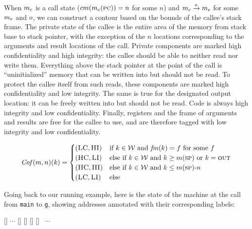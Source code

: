 \documentclass[acmsmall,review,anonymous]{acmart}\settopmatter{printfolios=true,printccs=false,printacmref=false}
\begin{document}
{When \(m_c\) is a call state (\(cm(m_c(\textsc{pc})) = n\) for some $n$) and
\(m_c \xrightarrow{o} m_e\) for some
$m_e$ and $o$, we can construct a contour based on the bounds of the
callee's stack frame.
%
The private state of the callee is the entire area of the memory from
stack base to stack pointer, with the exception of the $n$ locations
corresponding to the arguments and result locations of the
call. Private components are marked high confidentiality and high
integrity: the callee should be able to neither read nor write them.
%
Everything above the stack pointer at the point of the call is
``uninitialized'' memory that can be written into but should not be
read. To protect the callee itself from such reads, these components
are marked high confidentiality and low integrity.
%
The same is true for the designated output location: it can be
freely written into but should not be read.
%
Code is always high integrity and low confidentiality.
%
Finally, registers and the frame of arguments and results are free
for the callee to use, and are therefore tagged with low integrity and
low confidentiality.

 \[\mathit{Cof}(m,n)(k) =
  \begin{cases}
    (\textsc{LC},\textsc{HI}) & \text{if } k \in {\mathcal W}
                         \text{ and } \mathit{fm}(k) = f \text{ for some }f\\
    (\textsc{HC},\textsc{LI}) & \text{else if } k \in {\mathcal W}
                          \text{ and } k \geq m(\textsc{sp})
                          \text{ or } k = \textsc{out}\\
    (\textsc{HC},\textsc{HI}) & \text{else if } k \in {\mathcal W}
                          \text{ and } k \leq m(\textsc{sp}) \textrm{-}  n \\
    (\textsc{LC},\textsc{LI}) & \text{else} \\
  \end{cases}\]

Going back to our running example, here is the state of the machine at
the call from {\tt main} to {\tt g}, showing addresses annotated with their
corresponding labels:
\vspace*{0.2em}
\begin{center}
\MemoryLabel{43.5em}{2em}{\SP}
[{\makebox[0pt]{$(\HIGHSEC,\HIGHINT)$}}]%
\hspace*{3pt}
$\cdots$
[{\makebox[0pt]{$(\HIGHSEC, \LOWINT)$}}]%
[{\makebox[0pt]{$(\HIGHSEC, \HIGHINT)$}}]%
[{\makebox[0pt]{$(\LOWSEC, \LOWINT)$}}]%
[{\makebox[0pt]{$(\HIGHSEC, \LOWINT)$}}]
~$\cdots$
\\
\end{center}

}
\end{document}

